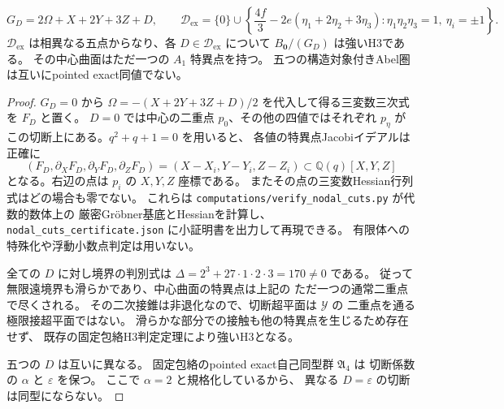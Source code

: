 \begin{proposition}[五つの厳密な結節中心H3例]
\label{prop:five-nodal-witnesses}
\[
 G_D=2\Omega+X+2Y+3Z+D,
 \qquad
 \mathcal D_{\mathrm{ex}}=\{0\}\cup
 \left\{\frac{4f}{3}-2e(\eta_1+2\eta_2+3\eta_3):
 \eta_1\eta_2\eta_3=1,\ \eta_i=\pm1\right\}.
\]
$\mathcal D_{\mathrm{ex}}$ は相異なる五点からなり、各 $D\in\mathcal D_{\mathrm{ex}}$ について
$B_{\mathbf0}/(G_D)$ は強いH3である。
その中心曲面はただ一つの $A_1$ 特異点を持つ。
五つの構造対象付きAbel圏は互いにpointed exact同値でない。
\end{proposition}
\begin{proof}
$G_D=0$ から
$\Omega=-(X+2Y+3Z+D)/2$ を代入して得る三変数三次式を $F_D$ と置く。
$D=0$ では中心の二重点 $p_0$、その他の四値ではそれぞれ $p_\eta$ が
この切断上にある。$q^2+q+1=0$ を用いると、
各値の特異点Jacobiイデアルは正確に
\[
 (F_D,\partial_XF_D,\partial_YF_D,\partial_ZF_D)
   =(X-X_i,Y-Y_i,Z-Z_i) \subset\mathbb Q(q)[X,Y,Z]
\]
となる。右辺の点は $p_i$ の $X,Y,Z$ 座標である。
またその点の三変数Hessian行列式はどの場合も零でない。
これらは \texttt{computations/verify\_nodal\_cuts.py} が代数的数体上の
厳密Gr\"obner基底とHessianを計算し、
\texttt{nodal\_cuts\_certificate.json} に小証明書を出力して再現できる。
有限体への特殊化や浮動小数点判定は用いない。

全ての $D$ に対し境界の判別式は
$\Delta=2^3+27\cdot1\cdot2\cdot3=170\ne0$ である。
従って無限遠境界も滑らかであり、中心曲面の特異点は上記の
ただ一つの通常二重点で尽くされる。
その二次接錐は非退化なので、切断超平面は $\mathcal Y$ の
二重点を通る極限接超平面ではない。
滑らかな部分での接触も他の特異点を生じるため存在せず、
既存の固定包絡H3判定定理により強いH3となる。

五つの $D$ は互いに異なる。
固定包絡のpointed exact自己同型群 $\mathfrak A_4$ は
切断係数の $\alpha$ と $\varepsilon$ を保つ。
ここで $\alpha=2$ と規格化しているから、
異なる $D=\varepsilon$ の切断は同型にならない。
\end{proof}

